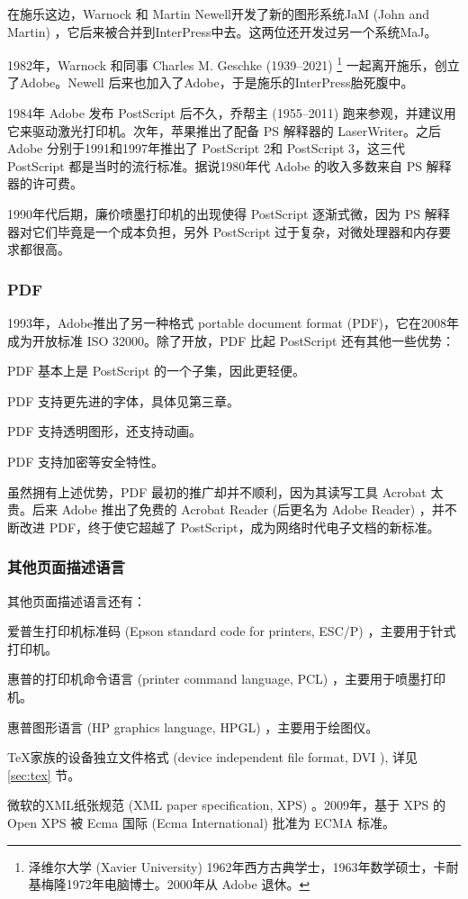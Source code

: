 在施乐这边，Warnock 和 Martin Newell\indexNewell 开发了新的图形系统JaM (John and Martin) ，它后来被合并到InterPress中去。这两位还开发过另一个系统MaJ。

1982年，Warnock 和同事 Charles M. Geschke (1939--2021)\indexGeschke{} \footnote{泽维尔大学 (Xavier University) 1962年西方古典学士，1963年数学硕士，卡耐基梅隆1972年电脑博士。2000年从 Adobe 退休。} 一起离开施乐，创立了Adobe\indexAdobe{}。Newell 后来也加入了Adobe，于是施乐的InterPress胎死腹中。

1984年 Adobe 发布 PostScript 后不久，乔帮主 (1955--2011)\indexJobs{} 跑来参观，并建议用它来驱动激光打印机。次年，苹果推出了配备 PS 解释器的 LaserWriter。之后 Adobe 分别于1991和1997年推出了 PostScript 2和 PostScript 3，这三代 PostScript 都是当时的流行标准。据说1980年代 Adobe 的收入多数来自 PS 解释器的许可费。

1990年代后期，廉价喷墨打印机的出现使得 PostScript 逐渐式微，因为 PS 解释器对它们毕竟是一个成本负担，另外 PostScript 过于复杂，对微处理器和内存要求都很高。

\subsubsection{PDF}
1993年，Adobe推出了另一种格式 portable document format (PDF)，它在2008年成为开放标准 ISO\indexISO{} 32000。除了开放，PDF 比起 PostScript 还有其他一些优势：

\begin{compactitem}
  \item PDF 基本上是 PostScript 的一个子集，因此更轻便。
  \item PDF 支持更先进的字体，具体见第三章。
  \item PDF 支持透明图形，还支持动画。
  \item PDF 支持加密等安全特性。
\end{compactitem}

虽然拥有上述优势，PDF 最初的推广却并不顺利，因为其读写工具 Acrobat 太贵。后来 Adobe 推出了免费的 Acrobat Reader (后更名为 Adobe Reader) ，并不断改进 PDF，终于使它超越了 PostScript，成为网络时代电子文档的新标准。

\subsubsection{其他页面描述语言}

其他页面描述语言还有：
\begin{compactitem}
   \item 爱普生\indexEpson{}打印机标准码 (Epson standard code for printers, ESC/P) ，主要用于针式打印机。
   \item 惠普\indexHP{}的打印机命令语言 (printer command language, PCL) ，主要用于喷墨打印机。
   \item 惠普图形语言 (HP graphics language, HPGL) ，主要用于绘图仪。
   \item \TeX 家族的设备独立文件格式 (device independent file format,  DVI ), 详见 \ref{sec:tex} 节。
   \item 微软\indexMSFT 的XML纸张规范 (XML paper specification, XPS) 。2009年，基于 XPS 的 Open XPS 被 Ecma 国际 (Ecma International)\indexECMA{} 批准为 ECMA 标准。
\end{compactitem}

